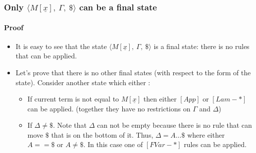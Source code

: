 \documentclass[a4paper, 10pt]{article}
\newcommand{\InContext}[2]{{#1}\left[{#2}\right]}
\begin{document}
\subsubsection{Only $\langle \InContext{M}{\underline{x}},\ \Gamma,\ \$ \rangle$ can be a final state}
\paragraph{Proof}
\begin{itemize}
\item It is easy to see that the state $\langle \InContext{M}{\underline{x}},\ \Gamma,\ \$ \rangle$ is a final state: there is no rules that can be applied.
\item Let's prove that there is no other final states (with respect to the form of the state). Consider another state which either :
  \begin{itemize}
  \item If current term is not equal to $\InContext{M}{\underline{x}}$ then either $[App]$ or $[Lam-*]$ can be applied.
  (together they have no restrictions on $\Gamma$ and $\Delta$)
  \item If $\Delta \ne \$$. Note that $\Delta$ can not be empty because there is no rule that can move $\$$ that is on the bottom of it. Thus, $\Delta = A \dots \$$ where either $A == \$$ or $A \ne \$$. In this case one of $[FVar-*]$ rules can be applied.
  \end{itemize}
\end{itemize}
\end{document}
